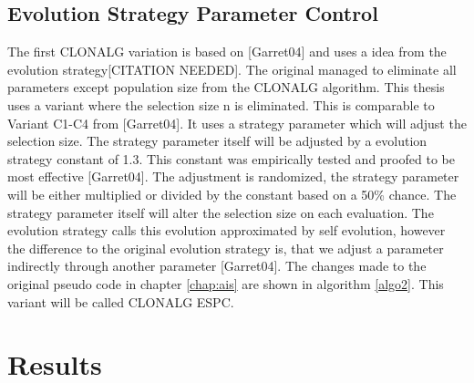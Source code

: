 \subsection{Evolution Strategy Parameter Control}
The first CLONALG variation is based on [Garret04] and uses a idea from the evolution strategy[CITATION NEEDED]. The original managed to eliminate all parameters except population size from the CLONALG algorithm. This thesis uses a variant where the selection size n is eliminated. This is comparable to Variant C1-C4 from [Garret04]. It uses a strategy parameter which will adjust the selection size. The strategy parameter itself will be adjusted by a evolution strategy constant of 1.3. This constant was empirically tested and proofed to be most effective [Garret04]. The adjustment is randomized, the strategy parameter will be either multiplied or divided by the constant based on a 50\% chance. The strategy parameter itself will alter the selection size on each evaluation. The evolution strategy calls this evolution approximated by self evolution, however the difference to the original evolution strategy is, that we adjust a parameter indirectly through another parameter [Garret04]. The changes made to the original pseudo code in chapter \ref{chap:ais} are shown in algorithm \ref{algo2}. This variant will be called CLONALG ESPC.
\section{Results}
